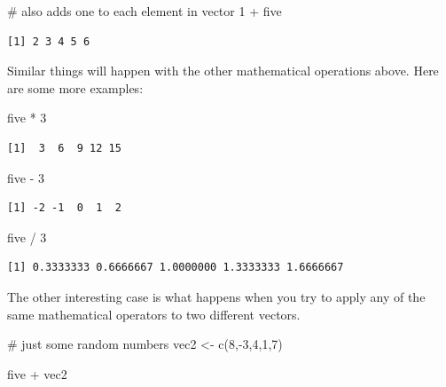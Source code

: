 \documentclass[
  letterpaper,
  DIV=11,
  numbers=noendperiod]{scrreprt}
\newenvironment{Shaded}{\begin{snugshade}}{\end{snugshade}}
\newcommand{\CommentTok}[1]{\textcolor[rgb]{0.37,0.37,0.37}{#1}}
\newcommand{\DecValTok}[1]{\textcolor[rgb]{0.68,0.00,0.00}{#1}}
\newcommand{\FunctionTok}[1]{\textcolor[rgb]{0.28,0.35,0.67}{#1}}
\newcommand{\NormalTok}[1]{\textcolor[rgb]{0.00,0.23,0.31}{#1}}
\newcommand{\OtherTok}[1]{\textcolor[rgb]{0.00,0.23,0.31}{#1}}
\newcommand{\SpecialCharTok}[1]{\textcolor[rgb]{0.37,0.37,0.37}{#1}}
\begin{document}
\begin{Shaded}
\begin{Highlighting}[]
\CommentTok{\# also adds one to each element in vector}
\DecValTok{1} \SpecialCharTok{+}\NormalTok{ five}
\end{Highlighting}
\end{Shaded}

\begin{verbatim}
[1] 2 3 4 5 6
\end{verbatim}

Similar things will happen with the other mathematical operations above.
Here are some more examples:

\begin{Shaded}
\begin{Highlighting}[]
\NormalTok{five }\SpecialCharTok{*} \DecValTok{3}
\end{Highlighting}
\end{Shaded}

\begin{verbatim}
[1]  3  6  9 12 15
\end{verbatim}

\begin{Shaded}
\begin{Highlighting}[]
\NormalTok{five }\SpecialCharTok{{-}} \DecValTok{3}
\end{Highlighting}
\end{Shaded}

\begin{verbatim}
[1] -2 -1  0  1  2
\end{verbatim}

\begin{Shaded}
\begin{Highlighting}[]
\NormalTok{five }\SpecialCharTok{/} \DecValTok{3}
\end{Highlighting}
\end{Shaded}

\begin{verbatim}
[1] 0.3333333 0.6666667 1.0000000 1.3333333 1.6666667
\end{verbatim}

The other interesting case is what happens when you try to apply any of
the same mathematical operators to two different vectors.

\begin{Shaded}
\begin{Highlighting}[]
\CommentTok{\# just some random numbers}
\NormalTok{vec2 }\OtherTok{\textless{}{-}} \FunctionTok{c}\NormalTok{(}\DecValTok{8}\NormalTok{,}\SpecialCharTok{{-}}\DecValTok{3}\NormalTok{,}\DecValTok{4}\NormalTok{,}\DecValTok{1}\NormalTok{,}\DecValTok{7}\NormalTok{)}

\NormalTok{five }\SpecialCharTok{+}\NormalTok{ vec2}
\end{Highlighting}
\end{Shaded}
\end{document}
